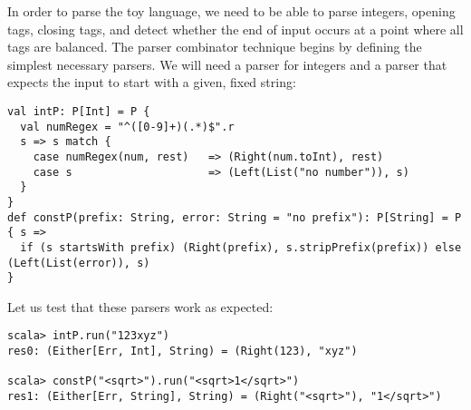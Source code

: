 In order to parse the toy language, we need to be able to parse integers,
opening tags, closing tags, and detect whether the end of input occurs
at a point where all tags are balanced. The parser combinator technique
begins by defining the simplest necessary parsers. We will need a
parser for integers and a parser that expects the input to start with
a given, fixed string:
\begin{lstlisting}
val intP: P[Int] = P { 
  val numRegex = "^([0-9]+)(.*)$".r
  s => s match {
    case numRegex(num, rest)   => (Right(num.toInt), rest)
    case s                     => (Left(List("no number")), s)
  } 
}
def constP(prefix: String, error: String = "no prefix"): P[String] = P { s =>
  if (s startsWith prefix) (Right(prefix), s.stripPrefix(prefix)) else (Left(List(error)), s)
}
\end{lstlisting}
Let us test that these parsers work as expected:
\begin{lstlisting}
scala> intP.run("123xyz")
res0: (Either[Err, Int], String) = (Right(123), "xyz")

scala> constP("<sqrt>").run("<sqrt>1</sqrt>")
res1: (Either[Err, String], String) = (Right("<sqrt>"), "1</sqrt>")
\end{lstlisting}

